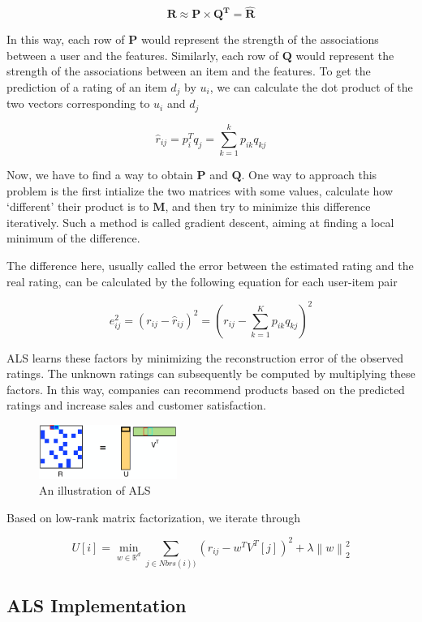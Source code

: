 \documentclass[conference]{IEEEtran}
\begin{document}
$$ \boldsymbol{R \approx P \times Q^T = \hat{R}} $$

In this way, each row of $\boldsymbol{P}$ would represent the strength of the associations between a user and the features. Similarly, each row of $\boldsymbol{Q}$ would represent the strength of the associations between an item and the features. To get the prediction of a rating of an item $d_j$ by $u_i$, we can calculate the dot product of the two vectors corresponding to $u_i$ and $d_j$

$$ \hat{r}_{ij} = p^T_i q_j = \sum_{k=1}^{k}p_{ik} q_{kj} $$

Now, we have to find a way to obtain $\boldsymbol{P}$ and $\boldsymbol{Q}$. One way to approach this problem is the first intialize the two matrices with some values, calculate how `different’ their product is to $\boldsymbol{M}$, and then try to minimize this difference iteratively. Such a method is called gradient descent, aiming at finding a local minimum of the difference.

The difference here, usually called the error between the estimated rating and the real rating, can be calculated by the following equation for each user-item pair

$$ e^2_{ij} = (r_{ij} - \hat{r}_{ij})^2 = (r_{ij} - \sum_{k=1}^{K}p_{ik} q_{kj})^2 $$

ALS learns these factors by minimizing the reconstruction error of the observed ratings. The unknown ratings can subsequently be computed by multiplying these factors. In this way, companies can recommend products based on the predicted ratings and increase sales and customer satisfaction.


\begin{figure}[h]
\centering
\includegraphics[width=0.4\textwidth]{image/als-illustration.png}
\caption{An illustration of ALS}
\end{figure}


Based on low-rank matrix factorization, we iterate through

$$U[i] = \min_{w \in \mathbb{R}^d} \sum_{j \in Nbrs(i))} (r_{ij} - w^TV^T[j])^2 + \lambda \left \| w \right \|^2_2$$


\subsection{ALS Implementation}
\end{document}
